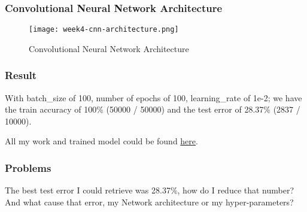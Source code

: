 \subsubsection{Convolutional Neural Network Architecture}
\begin{figure}[!ht]
\centering
\texttt{[image: week4-cnn-architecture.png]}
\caption{Convolutional Neural Network Architecture}
\end{figure}

\subsubsection{Result}
With batch\_size of 100, number of epochs of 100, learning\_rate of 1e-2; we have the train accuracy of 100\% (50000 / 50000) and the test error of 28.37\% (2837 / 10000).

All my work and trained model could be found \href{https://gitlab.com/tlvu2697/image-classification-cifar10}{here}.

\subsubsection{Problems}
The best test error I could retrieve was 28.37\%, how do I reduce that number? And what cause that error, my Network architecture or my hyper-parameters?